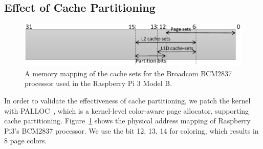 \subsection{Effect of Cache Partitioning}

\begin{figure}
  \centering
  \includegraphics[width=.5\textwidth]{figs/cache-mapping}
  \caption{A memory mapping of the cache sets for the Broadcom 
BCM2837 processor used in the Raspberry Pi 3 Model B.}
  \label{fig:cache-mapping}
\end{figure}





In order to validate the effectiveness of cache partitioning, we patch
the kernel with PALLOC~\cite{yun2014rtas}, which is a kernel-level
color-aware page allocator, supporting cache partitioning. 
Figure~\ref{fig:cache-mapping} shows the physical address mapping of
Raspberry Pi3's BCM2837 processor. We use the bit 12, 13, 14 for
coloring, which results in 8 page colors.

